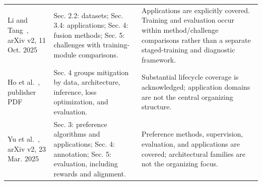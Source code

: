 \documentclass[10pt,onecolumn,journal,compsoc]{IEEEtran}
\begin{document}
\begin{table}[H]
\begin{tabularx}{\textwidth}{>{\raggedright\arraybackslash}p{}XX}
Li and Tang~\cite{li2024alignmentfusion}, arXiv v2, 11 Oct. 2025 & Sec. 2.2: datasets; Sec. 3.4: applications; Sec. 4: fusion methods; Sec. 5: challenges with training-module comparisons. & Applications are explicitly covered. Training and evaluation occur within method/challenge comparisons rather than a separate staged-training and diagnostic framework.\\
Ho et al.~\cite{ho2026hallucinationunderstanding}, publisher PDF & Sec. 4 groups mitigation by data, architecture, inference, loss optimization, and evaluation. & Substantial lifecycle coverage is acknowledged; application domains are not the central organizing structure.\\
Yu et al.~\cite{yu2025preferencesurvey}, arXiv v2, 23 Mar. 2025 & Sec. 3: preference algorithms and applications; Sec. 4: annotation; Sec. 5: evaluation, including rewards and alignment. & Preference methods, supervision, evaluation, and applications are covered; architectural families are not the organizing focus.\\
\bottomrule
\end{tabularx}
\end{table}
\end{document}
